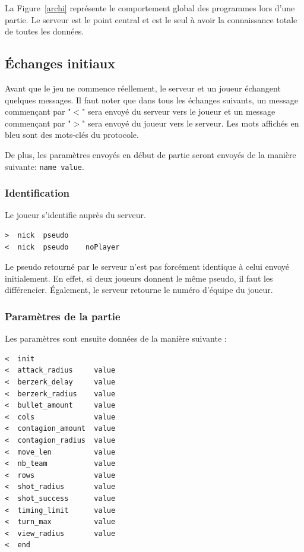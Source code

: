 La Figure~\ref{archi} représente le comportement global des programmes lors d'une partie.
Le serveur est le point central et est le seul à avoir la connaissance totale de toutes les données.



\subsection{Échanges initiaux} %
\label{initial}
Avant que le jeu ne commence réellement, le serveur et un joueur échangent quelques messages.
Il faut noter que dans tous les échanges suivants, un message commençant par "$<$" sera envoyé du serveur vers le joueur et un message commençant par "$>$" sera envoyé du joueur vers le serveur.
Les mots affichés en bleu sont des mots-clés du protocole.

De plus, les paramètres envoyés en début de partie seront envoyés de la manière suivante: \lstinline!name value!.

\subsubsection{Identification} %
\label{identification}
Le joueur s'identifie auprès du serveur.

\begin{lstlisting}
>  nick  pseudo
<  nick  pseudo    noPlayer 
\end{lstlisting}

Le pseudo retourné par le serveur n'est pas forcément identique à celui envoyé initialement.
En effet, si deux joueurs donnent le même pseudo, il faut les différencier.
Également, le serveur retourne le numéro d'équipe du joueur.


\subsubsection{Paramètres de la partie} %

Les paramètres sont ensuite données de la manière suivante :

\begin{lstlisting}
<  init
<  attack_radius     value
<  berzerk_delay     value
<  berzerk_radius    value
<  bullet_amount     value
<  cols              value
<  contagion_amount  value
<  contagion_radius  value
<  move_len          value
<  nb_team           value
<  rows              value
<  shot_radius       value
<  shot_success      value
<  timing_limit      value
<  turn_max          value
<  view_radius       value
<  end
\end{lstlisting}

